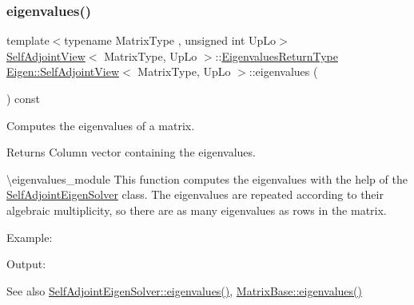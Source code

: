 \subsubsection{\texorpdfstring{eigenvalues()}{eigenvalues()}}
{\footnotesize\ttfamily template$<$typename Matrix\+Type , unsigned int Up\+Lo$>$ \\
\mbox{\hyperlink{class_eigen_1_1_self_adjoint_view}{Self\+Adjoint\+View}}$<$ Matrix\+Type, Up\+Lo $>$\+::\mbox{\hyperlink{class_eigen_1_1_self_adjoint_view_a8ae92703d920130b38a383f8b165146c}{Eigenvalues\+Return\+Type}} \mbox{\hyperlink{class_eigen_1_1_self_adjoint_view}{Eigen\+::\+Self\+Adjoint\+View}}$<$ Matrix\+Type, Up\+Lo $>$\+::eigenvalues (\begin{DoxyParamCaption}{ }\end{DoxyParamCaption}) const\hspace{0.3cm}{\ttfamily [inline]}}



Computes the eigenvalues of a matrix. 

\begin{DoxyReturn}{Returns}
Column vector containing the eigenvalues.
\end{DoxyReturn}
\textbackslash{}eigenvalues\+\_\+module This function computes the eigenvalues with the help of the \mbox{\hyperlink{class_eigen_1_1_self_adjoint_eigen_solver}{Self\+Adjoint\+Eigen\+Solver}} class. The eigenvalues are repeated according to their algebraic multiplicity, so there are as many eigenvalues as rows in the matrix.

Example\+: 
\begin{DoxyCodeInclude}{0}
\end{DoxyCodeInclude}
 Output\+: 
\begin{DoxyVerbInclude}
\end{DoxyVerbInclude}


\begin{DoxySeeAlso}{See also}
\mbox{\hyperlink{class_eigen_1_1_self_adjoint_eigen_solver_a8efab27e82aa6aa0ae0c64739238c2e0}{Self\+Adjoint\+Eigen\+Solver\+::eigenvalues()}}, \mbox{\hyperlink{class_eigen_1_1_matrix_base_a30430fa3d5b4e74d312fd4f502ac984d}{Matrix\+Base\+::eigenvalues()}} 
\end{DoxySeeAlso}
\mbox{\label{class_eigen_1_1_self_adjoint_view_a644155eef17b37c95d85b9f65bb49ac4}} 
